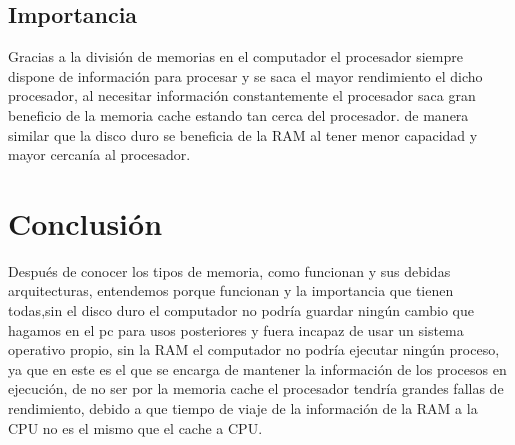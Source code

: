 \documentclass{article}
\begin{document}
\subsection{Importancia}
Gracias a la división de memorias en el computador el procesador siempre dispone de información para procesar y se saca el mayor rendimiento el dicho procesador, al necesitar información constantemente el procesador saca gran beneficio de la memoria cache estando tan cerca del procesador. \cite{Osan}de manera similar que la disco duro se beneficia de la RAM al tener menor capacidad y mayor cercanía al procesador.
\section{Conclusión} \label{conclulsion}
Después de conocer los tipos de memoria, como funcionan y sus debidas arquitecturas, entendemos porque funcionan y la importancia que tienen todas,sin el disco duro el computador no podría guardar ningún cambio que hagamos en el pc para usos posteriores y fuera incapaz de usar un sistema operativo propio, sin la RAM el computador no podría ejecutar ningún proceso, ya que en este es el que se encarga de mantener la información de los procesos en ejecución, de no ser por la memoria cache el procesador tendría grandes fallas de rendimiento, debido a que tiempo de viaje de la información de la RAM a la CPU no es el mismo que el cache a CPU.
\newpage


\end{document}
